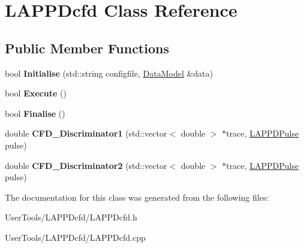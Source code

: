 \hypertarget{classLAPPDcfd}{
\section{LAPPDcfd Class Reference}
\label{classLAPPDcfd}
}
\subsection*{Public Member Functions}
\begin{DoxyCompactItemize}
\item 
\hypertarget{classLAPPDcfd_a712d671041c6dd069c060ad9eee43b5f}{
bool {\bfseries Initialise} (std::string configfile, \hyperlink{classDataModel}{DataModel} \&data)}
\label{classLAPPDcfd_a712d671041c6dd069c060ad9eee43b5f}

\item 
\hypertarget{classLAPPDcfd_a7776cd36991d9ccd6ed510c58b83f765}{
bool {\bfseries Execute} ()}
\label{classLAPPDcfd_a7776cd36991d9ccd6ed510c58b83f765}

\item 
\hypertarget{classLAPPDcfd_a9506c223f4626d40539efd132fc21acc}{
bool {\bfseries Finalise} ()}
\label{classLAPPDcfd_a9506c223f4626d40539efd132fc21acc}

\item 
\hypertarget{classLAPPDcfd_a81ca5d4bda97c4e0aeb8440af918a799}{
double {\bfseries CFD\_\-Discriminator1} (std::vector$<$ double $>$ $\ast$trace, \hyperlink{classLAPPDPulse}{LAPPDPulse} pulse)}
\label{classLAPPDcfd_a81ca5d4bda97c4e0aeb8440af918a799}

\item 
\hypertarget{classLAPPDcfd_a6473bfb16d498aa3ac23b566fe2a4d89}{
double {\bfseries CFD\_\-Discriminator2} (std::vector$<$ double $>$ $\ast$trace, \hyperlink{classLAPPDPulse}{LAPPDPulse} pulse)}
\label{classLAPPDcfd_a6473bfb16d498aa3ac23b566fe2a4d89}

\end{DoxyCompactItemize}


The documentation for this class was generated from the following files:\begin{DoxyCompactItemize}
\item 
UserTools/LAPPDcfd/LAPPDcfd.h\item 
UserTools/LAPPDcfd/LAPPDcfd.cpp\end{DoxyCompactItemize}
